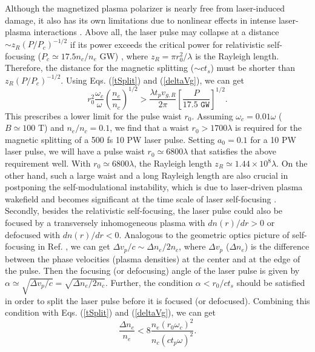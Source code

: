 \documentclass[%
aps,
preprint,
showpacs,
preprintnumbers,
 amsmath,
 amssymb,
 prl,
]{revtex4-1}
\begin{document}
Although the magnetized plasma polarizer is nearly free from laser-induced damage, it also has its own limitations due to nonlinear effects in intense laser-plasma interactions \cite{GibbonBook,HoraBook}.
Above all, the laser pulse may collapse at a distance $\sim z_R (P/P_c)^{-1/2}$ if its power exceeds the critical power for relativistic self-focusing ($P_c \simeq 17.5 n_c/n_e $ GW) \cite{GibbonBook}, where $z_R=\pi r_0^2/\lambda$ is the Rayleigh length. Therefore, the distance for the magnetic splitting ($\sim ct_s$) must be shorter than $z_R (P/P_c)^{-1/2}$. Using Eqs. (\ref{tSplit}) and (\ref{deltaVg}), we can get
\begin{equation}
r_0^2 \frac{\omega_c}{\omega} (\frac{n_e}{n_c})^{1/2} > \frac{\lambda  t_p v_{g,R} }{2\pi} [\frac{P}{17.5 \texttt{ GW}}]^{1/2}.
\end{equation}
This prescribes a lower limit for the pulse waist $r_0$.
Assuming $\omega_c=0.01\omega$ ($B\simeq 100$ T) and $n_e/n_c=0.1$, we find that a waist $r_0 > 1700\lambda$ is required for the magnetic splitting of a 500 fs 10 PW laser pulse.
Setting $a_0=0.1$ for a 10 PW laser pulse, we will have a pulse waist $r_0 \simeq  6800\lambda$ that satisfies the above requirement well.
With $r_0 \simeq 6800\lambda$, the Rayleigh length $z_R \simeq 1.44 \times 10^{8} \lambda$.
On the other hand,  such a large waist and a long Rayleigh length are also crucial in postponing the self-modulational instability, which is due to laser-driven plasma wakefield and becomes significant at the time scale of laser self-focusing \cite{GibbonBook,Antonsen,Esarey}.
Secondly, besides the relativistic self-focusing, the laser pulse could also be focused by a transversely inhomogeneous plasma with $dn(r)/dr>0$ or defocused with $dn(r)/dr<0$.
Analogous to the geometric optics picture of self-focusing in Ref. \cite{GibbonBook}, we can get $\Delta v_p/c \sim \Delta n_e/2n_c$, where $\Delta v_p$ ($\Delta n_e$) is the difference between the phase velocities (plasma densities) at the center and at the edge of the pulse.
Then the focusing (or defocusing) angle of the laser pulse is given by $\alpha \simeq  \sqrt{\Delta v_p/c}  = \sqrt{\Delta n_e/2n_c}$.
Further, the condition $\alpha < r_0/ct_s$ should be satisfied in order to split the laser pulse before it is focused (or defocused).
Combining this condition with Eqs. (\ref{tSplit}) and (\ref{deltaVg}), we can get
\begin{equation}
\frac{\Delta n_e}{n_e} < 8 \frac{n_e (r_0 \omega_c )^2} {  n_c (c t_p \omega)^2}. \label{Dne}
\end{equation}
\end{document}
